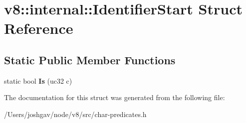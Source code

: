\hypertarget{structv8_1_1internal_1_1_identifier_start}{}\section{v8\+:\+:internal\+:\+:Identifier\+Start Struct Reference}
\label{structv8_1_1internal_1_1_identifier_start}
\subsection*{Static Public Member Functions}
\begin{DoxyCompactItemize}
\item 
static bool {\bfseries Is} (uc32 c)\hypertarget{structv8_1_1internal_1_1_identifier_start_a21ff6b7890b45213d7841a8a571c3e39}{}\label{structv8_1_1internal_1_1_identifier_start_a21ff6b7890b45213d7841a8a571c3e39}

\end{DoxyCompactItemize}


The documentation for this struct was generated from the following file\+:\begin{DoxyCompactItemize}
\item 
/\+Users/joshgav/node/v8/src/char-\/predicates.\+h\end{DoxyCompactItemize}
